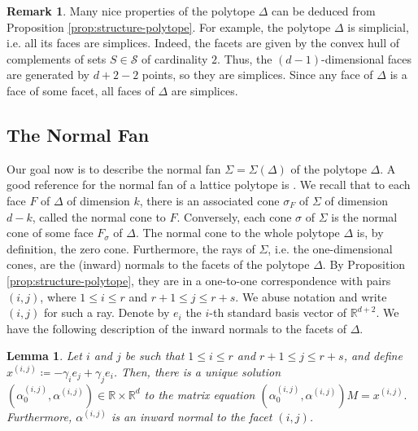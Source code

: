 \documentclass[11pt, reqno]{amsart}
\theoremstyle{plain}
\newtheorem{lem}[theo]{Lemma}
\theoremstyle{definition}
\newtheorem{rem}[theo]{Remark}
\newcommand{\R}{\mathbb{R}}
\newcommand{\ga}{\gamma}
\newcommand{\al}{\alpha}
\begin{document}
\begin{rem}
Many nice properties of the polytope $\Delta$ can be deduced from Proposition \ref{prop:structure-polytope}. For example, the polytope $\Delta$ is simplicial, i.e. all its faces are simplices. Indeed, the facets are given by the convex hull of complements of sets $S \in \mathcal{S}$ of cardinality $2$.
Thus, the $(d-1)$-dimensional faces are generated by $d+2-2$ points, so they are simplices. Since any face of $\Delta$ is a face of some facet, all faces of $\Delta$ are simplices.

\end{rem}
\subsection*{The Normal Fan} 
Our goal now is to describe the normal fan $\Sigma=\Sigma(\Delta)$ of the polytope $\Delta$. A good reference for the normal fan of a lattice polytope is \cite[\S 2.3]{cox}.
We recall that to each face $F$ of $\Delta$ of dimension $k$, there is an associated cone $\sigma_F$ of $\Sigma$ of dimension $d-k$, called the normal cone to $F$. 
Conversely, each cone $\sigma$ of $\Sigma$ is the normal cone of some face $F_{\sigma}$ of $\Delta$.
The normal cone to the whole polytope $\Delta$ is, by definition, the zero cone.
Furthermore, the rays of $\Sigma$, i.e. the one-dimensional cones, are the (inward) normals to the facets of the polytope $\Delta$. 
By Proposition \ref{prop:structure-polytope}, they are in a one-to-one correspondence with pairs $(i,j)$, where $1 \le i \le r$ and $r+1 \le j \le r+s$. 
We abuse notation and write $(i,j)$ for such a ray. Denote by $e_i$ the $i$-th standard basis vector of $\R^{d+2}$.  
We have the following description of the inward normals to the facets of $\Delta$.

\begin{lem}\label{lem:normals}
Let $i$ and $j$ be such that $1 \le i \le r$ and $r+1 \le j \le r+s$, and define $x^{(i,j)} \coloneqq -\ga_i e_j + \ga_j e_i$.
Then, there is a unique solution $(\al_0^{(i,j)},\al^{(i,j)}) \in \R\times\R^{d}$ to the matrix equation $(\al_0^{(i,j)},\al^{(i,j)}) M = x^{(i,j)}.$  Furthermore, $\al^{(i,j)}$ is an inward normal to the facet $(i,j)$.

\end{lem}
\end{document}
